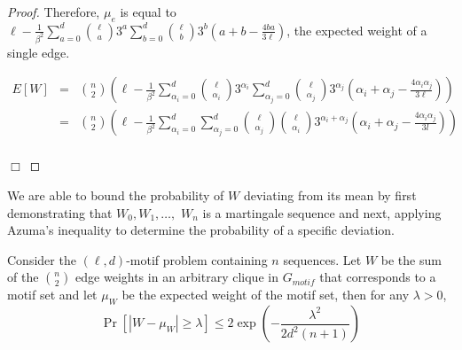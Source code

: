 \begin{proof}
Therefore, $\mu_{e}$ is equal to $\ell -  \frac{1}{\beta^2}  \sum_{a=0}^{d}{{\ell} \choose a}3^a\sum_{b=0}^{d}{{\ell} \choose b}3^b \left(  a+b-\frac{4ba}{3\ell} \right) $, the expected weight of a single edge. 

\begin{center}
\begin{math}	
\begin{array}{lll}
E \left[ W \right] 	&=& {n \choose 2} \left( \ell -  \frac{1}{\beta^2}  \sum_{\alpha_i=0}^{d}{{\ell} \choose {\alpha_i}}3^{\alpha_i}\sum_{\alpha_j =0}^{d}{{\ell} \choose \alpha_j}3^{\alpha_j} \left(  \alpha_i+ \alpha_j-\frac{4\alpha_i \alpha_j }{3\ell} \right) \right) \\		
 							&=& {n \choose 2} \left(\ell -  \frac{1}{\beta^2}  \sum_{\alpha_i =0}^{d} \sum_{\alpha_j =0}^{d}{{\ell} \choose {\alpha_j}}{{\ell} \choose {\alpha_i}}3^{\alpha_i + \alpha_j} \left(  \alpha_i +\alpha_j - \frac{4\alpha_i \alpha_j }{3l}\right) \right) \\		

\end{array}
\end{math}
\end{center} \hfill $\Box$	\end{proof}

We are able to bound the probability of $W$ deviating from its mean by first demonstrating that $W_0, W_1, \ldots,$ $W_n$ is a martingale sequence and next, applying Azuma's inequality \cite{MR95} to determine the probability of a specific deviation.

\begin{theorem}  \label{azuma_thm} Consider the $(\ell,d)$-motif problem containing $n$ sequences. Let $W$ be the sum of the ${n \choose 2}$ edge weights in an arbitrary clique in $G_{motif}$ that corresponds to a motif set and let $\mu_W$ be the expected weight of the motif set, then for any $\lambda > 0$,  
\[\Pr[|W - \mu_W| \geq \lambda] \leq 2 \exp \left( - \frac{\lambda^2}{2d^2(n + 1)}  \right) \]
\end{theorem}

